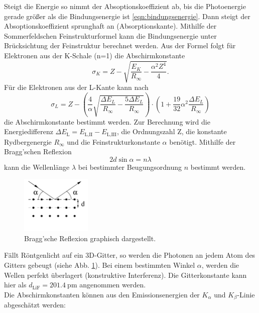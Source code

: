 Steigt die Energie so nimmt der Absoptionskoeffizient ab, bis die Photoenergie gerade größer als die Bindungsenergie ist \eqref{eqn:bindungsenergie}.
Dann steigt der Absoptionskoeffizient sprunghaft an (Absorptionskante).
Mithilfe der Sommerfeldschen Feinstrukturformel kann die Bindungsenergie unter Brücksichtung der Feinstruktur berechnet werden.
Aus der Formel folgt für Elektronen aus der K-Schale (n=1) die Abschirmkonstante
\begin{equation}
    \sigma_K = Z - \sqrt{\frac{E_K}{R_\infty} - \frac{\alpha^2 Z^4}{4}} .
    \label{eqn:abschirm_k}
\end{equation}
Für die Elektronen aus der L-Kante kann nach
\begin{equation}
    \sigma_L = Z - \left( \frac{4}{\alpha}\sqrt{\frac{\Delta E_L}{R_\infty} - \frac{5 \Delta E_L}{R_\infty}} \right) \cdot \left (1 + \frac{19}{32}\alpha^2 \frac{\Delta E_L}{R_\infty}  \right)
    \label{eqn:abschirm_l}
\end{equation}
die Abschirmkonstante bestimmt werden.
Zur Berechnung wird die Energiedifferenz $\Delta E_\text{L} = E_\text{L,II} - E_\text{L,III}$, die Ordnungszahl Z, die konstante Rydbergenergie $R_\infty$ und die Feinstrukturkonstante $\alpha$ benötigt.
Mithilfe der Bragg'schen Reflexion 
\begin{equation}
    2 d \sin \alpha = n \lambda
    \label{eqn:lambdaalpha}
\end{equation}
kann die Wellenlänge $\lambda$ bei bestimmter Beugungsordnung $n$ bestimmt werden.
\begin{figure}
    \centering
    \includegraphics[width=0.3\textwidth]{content/data/kristall.jpg}
    \caption{Bragg'sche Reflexion graphisch dargestellt. \cite[3]{anleitung}}
    \label{fig:bragg}
\end{figure}
Fällt Röntgenlicht auf ein 3D-Gitter, so werden die Photonen an jedem Atom des Gitters gebeugt (siehe Abb. \ref{fig:bragg}).
Bei einem bestimmten Winkel $\alpha$, werden die Wellen perfekt überlagert (konstruktive Interferenz).
Die Gitterkonstante kann hier als $d_\text{LiF}=\SI{201.4}{\pico\metre}$ angenommen werden.
\\
Die Abschirmkonstanten können aus den Emissionsenergien der $K_\alpha$ und $K_\beta$-Linie abgeschätzt werden:
